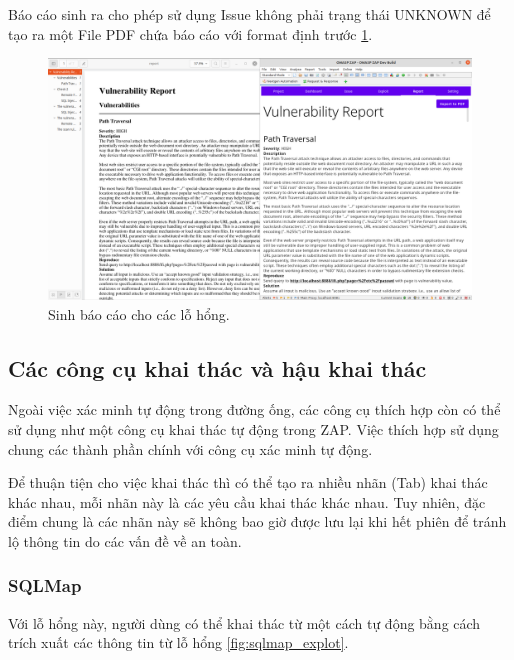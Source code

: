 \documentclass[./../main.tex]{subfiles}
\begin{document}
Báo cáo sinh ra cho phép sử dụng Issue không phải trạng thái
UNKNOWN để tạo ra một File PDF chứa báo cáo với format định trước \ref{fig:report}.

\begin{figure}[h!]
	\includegraphics[width=\linewidth]{./images/report.png}
	\caption{Sinh báo cáo cho các lỗ hổng.}
	\label{fig:report}
\end{figure}

\subsection{Các công cụ khai thác và hậu khai thác}

Ngoài việc xác minh tự động trong đường ống, các công cụ thích
hợp còn có thể sử dụng như một công cụ khai thác tự động trong ZAP.
Việc thích hợp sử dụng chung các thành phần chính với công cụ xác minh
tự động.

Để thuận tiện cho việc khai thác thì có thể tạo ra nhiều nhãn (Tab)
khai thác khác nhau, mỗi nhãn này là các yêu cầu khai thác khác nhau.
Tuy nhiên, đặc điểm chung là các nhãn này sẽ không bao giờ được lưu lại
khi hết phiên để tránh lộ thông tin do các vấn đề về an toàn.
\subsubsection{SQLMap}
Với lỗ hổng này, người dùng có thể khai thác từ một cách tự động
bằng cách trích xuất các thông tin từ lỗ hổng \ref{fig:sqlmap_explot}.
\end{document}
